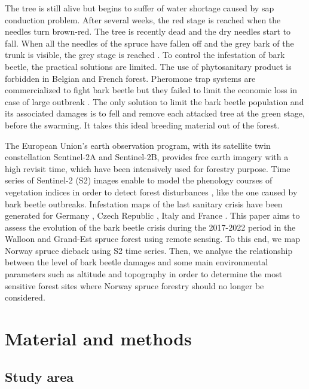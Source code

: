\documentclass[3p,procedia]{elsarticle}
\begin{document}
The tree is still alive but begins to suffer of water shortage caused by sap conduction problem. 
After several weeks, the red stage is reached when the needles turn brown-red. The tree is recently dead and the dry needles start to fall.
When all the needles of the spruce have fallen off and the grey bark of the trunk is visible, the grey stage is reached \citep{abdullah_european_2018}. 
To control the infestation of bark beetle, the practical solutions are limited. 
The use of phytosanitary product is forbidden in Belgian and French forest.
Pheromone trap systems are commercialized to fight bark beetle but they failed to limit the economic loss in case of large outbreak \citep{kuhn_pheromone_2022}.
The only solution to limit the bark beetle population and its associated damages is to fell and remove each attacked tree at the green stage, before the swarming.
It takes this ideal breeding material out of the forest.

The European Union’s earth observation program, with its satellite twin constellation Sentinel-2A and Sentinel-2B, provides free earth imagery with a high revisit time, which have been intensively used for forestry purpose. 
Time series of Sentinel-2 (S2) images enable to model the phenology courses of vegetation indices in order to detect forest disturbances \citep{low_phenology_2020}, like the one caused by bark beetle outbreaks.
Infestation maps of the last sanitary crisis have been generated for Germany \citep{ali_canopy_2021,thonfeld_first_2022}, Czech Republic \citep{barta_early_2021}, Italy \citep{dalponte_mapping_2022} and France \citep{nardi_drought_2022}. 
This paper aims to assess the evolution of the bark beetle crisis during the 2017-2022 period in the Walloon and Grand-Est spruce forest using remote sensing.
To this end, we map Norway spruce dieback using S2 time series.
Then, we analyse the relationship between the level of bark beetle damages and some main environmental parameters such as altitude and topography in order to determine the most sensitive forest sites where Norway spruce forestry should no longer be considered.

\section{Material and methods}
\subsection{Study area}
\end{document}
